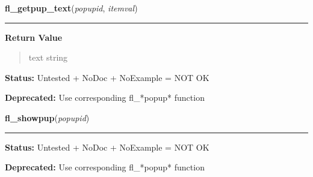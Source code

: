     \label{xformslib:deprecated:fl_getpup_text}

    \vspace{0.5ex}

\hspace{.8\funcindent}\begin{boxedminipage}{\funcwidth}

    \raggedright \textbf{fl\_getpup\_text}(\textit{popupid}, \textit{itemval})

    \vspace{-1.5ex}

    \rule{\textwidth}{0.5\fboxrule}
\setlength{\parskip}{2ex}
\setlength{\parskip}{1ex}
      \textbf{Return Value}
    \vspace{-1ex}

      \begin{quote}
      text string

      \end{quote}

\textbf{Status:} Untested + NoDoc + NoExample = NOT OK



\textbf{Deprecated:} Use corresponding fl\_*popup* function



    \end{boxedminipage}

    \label{xformslib:deprecated:fl_showpup}

    \vspace{0.5ex}

\hspace{.8\funcindent}\begin{boxedminipage}{\funcwidth}

    \raggedright \textbf{fl\_showpup}(\textit{popupid})

    \vspace{-1.5ex}

    \rule{\textwidth}{0.5\fboxrule}
\setlength{\parskip}{2ex}
\setlength{\parskip}{1ex}
\textbf{Status:} Untested + NoDoc + NoExample = NOT OK



\textbf{Deprecated:} Use corresponding fl\_*popup* function



    \end{boxedminipage}

